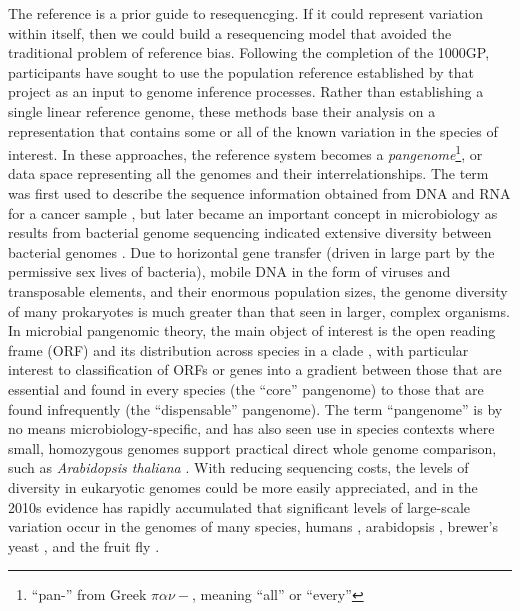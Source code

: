 The reference is a prior guide to resequencging.
If it could represent variation within itself, then we could build a resequencing model that avoided the traditional problem of reference bias.
Following the completion of the 1000GP, participants have sought to use the population reference established by that project as an input to genome inference processes.
Rather than establishing a single linear reference genome, these methods base their analysis on a representation that contains some or all of the known variation in the species of interest.
In these approaches, the reference system becomes a \emph{pangenome}\footnote{``pan-'' from Greek $\pi\alpha\nu-$, meaning ``all'' or ``every''}, or data space representing all the genomes and their interrelationships.
The term was first used to describe the sequence information obtained from DNA and RNA for a cancer sample \cite{sigaux2000cancer}, but later became an important concept in microbiology as results from bacterial genome sequencing indicated extensive diversity between bacterial genomes \cite{tettelin2005genome,medini2005microbial}.
Due to horizontal gene transfer (driven in large part by the permissive sex lives of bacteria), mobile DNA in the form of viruses and transposable elements, and their enormous population sizes, the genome diversity of many prokaryotes is much greater than that seen in larger, complex organisms.
In microbial pangenomic theory, the main object of interest is the open reading frame (ORF) and its distribution across species in a clade \cite{vernikos2015ten}, with particular interest to classification of ORFs or genes into a gradient between those that are essential and found in every species (the ``core'' pangenome) to those that are found infrequently (the ``dispensable'' pangenome).
The term ``pangenome'' is by no means microbiology-specific, and has also seen use in species contexts where small, homozygous genomes support practical direct whole genome comparison, such as \emph{Arabidopsis thaliana} \cite{cao2011whole}.
With reducing sequencing costs, the levels of diversity in eukaryotic genomes could be more easily appreciated, and in the 2010s evidence has rapidly accumulated that significant levels of large-scale variation occur in the genomes of many species, humans \cite{li2010building,sudmant2010,sudmant2015integrated,chaisson2018multi}, arabidopsis \cite{alonso2016arabidopsis}, brewer's yeast \cite{yue2017contrasting}, and the fruit fly \cite{chakraborty2018hidden}.

